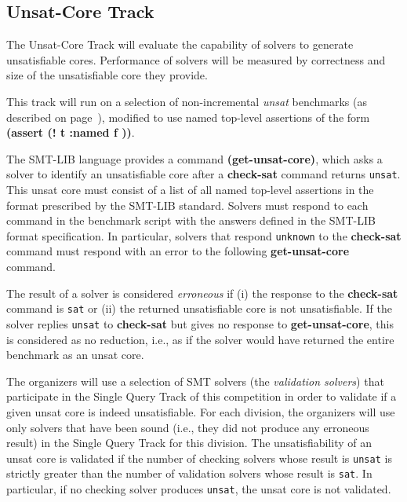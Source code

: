 \documentclass[12pt]{article}
\newcommand{\akey}[1]{\textbf{#1}\xspace}
\newcommand{\maintrack}{Single Query Track\xspace}
\newcommand{\inctrack}{Incremental Track\xspace}
\newcommand{\ucoretrack}{Unsat-Core Track\xspace}
\begin{document}

\subsection{\ucoretrack}
\label{sec:exec:unsat-core}

The \ucoretrack will evaluate the capability of solvers to generate
unsatisfiable cores.  Performance of solvers will be measured by correctness
and size of the unsatisfiable core they provide.

This track will run on a selection of non-incremental \emph{unsat} benchmarks
(as described on page~\pageref{benchmark-selection}), modified
to use named top-level assertions of the form \akey{(assert (! t :named f ))}.


The SMT-LIB language provides a command \akey{(get-unsat-core)}, which asks
a solver to identify an unsatisfiable core after a \akey{check-sat}
command returns \texttt{unsat}.
This unsat core must consist of a list of all named top-level
assertions in the format prescribed by the SMT-LIB standard.
%
Solvers must respond to each command in the benchmark script with the
answers defined in the SMT-LIB format specification.  In particular,
solvers that respond \texttt{unknown} to the \akey{check-sat} command
must respond with an error to the following \akey{get-unsat-core}
command.

The result of a solver is considered \emph{erroneous} if (i) the
response to the \akey{check-sat} command is \texttt{sat} or (ii) the
returned unsatisfiable core is not unsatisfiable.
%
If the solver replies \texttt{unsat} to \akey{check-sat} but gives no
response to \akey{get-unsat-core}, this is considered as no reduction, i.e.,
as if the solver would have returned the entire benchmark as an unsat
core.

The organizers will use a selection of SMT solvers (the \emph{validation
solvers}) that participate in the \maintrack of this competition in order to
validate if a given unsat core is indeed unsatisfiable.  For each division, the
organizers will use only solvers that have been sound (i.e., they did not
produce any erroneous result) in the \maintrack for this division.  The
unsatisfiability of an unsat core is validated if the number of checking solvers
whose result is \texttt{unsat} is strictly greater than the number of validation
solvers whose result is \texttt{sat}. In particular, if no checking solver
produces \texttt{unsat}, the unsat core is not validated.
\end{document}
